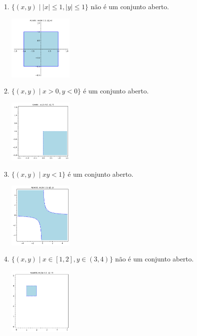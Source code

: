 \documentclass[../main.tex]{subfiles}
\begin{document}
\begin{solucao}
\begin{enumerate}[label=\alph*)]
\begin{center}
				\end{center}
				\item $\{(x,y) \mid |x|\leq1, |y|\leq1\}$ não é um conjunto aberto.
				\begin{center}
					\includegraphics[width=0.25\textwidth]{imagens/lista03/picture_lista03.02_q01_item05.png}
				\end{center}
				\item $\{(x,y) \mid x>0, y<0\}$ é um conjunto aberto.
				\begin{center}
					\includegraphics[width=0.25\textwidth]{imagens/lista03/picture_lista03.02_q01_item06.png}
				\end{center}
				\item $\{(x,y) \mid xy<1\}$ é um conjunto aberto.
				\begin{center}
					\includegraphics[width=0.25\textwidth]{imagens/lista03/picture_lista03.02_q01_item07.png}
				\end{center}
				\item $\{(x,y) \mid x\in [1,2], y\in (3,4)\}$ não é um conjunto aberto.
				\begin{center}
					\includegraphics[width=0.25\textwidth]{imagens/lista03/picture_lista03.02_q01_item08.png}

\end{center}
\end{enumerate}
\end{solucao}
\end{document}
